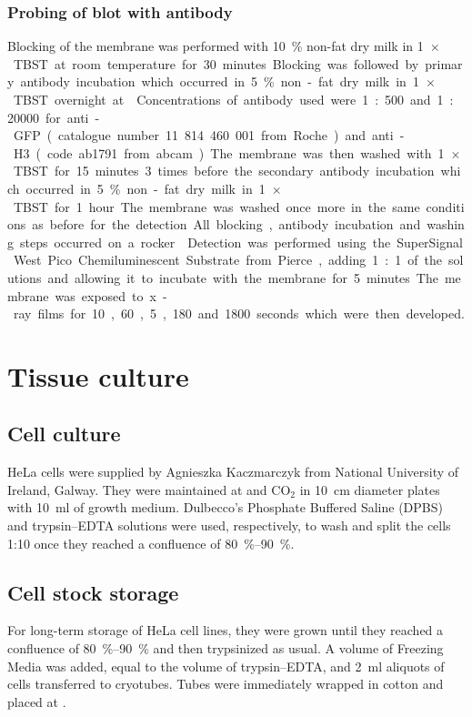     \subsubsection{Probing of blot with antibody}
      Blocking of the membrane was performed with \SI{10}{\percent} non-fat dry milk in \SI{1}{$\times$} TBST
      at room temperature for 30 minutes. Blocking was followed by primary antibody
      incubation which occurred in \SI{5}{\percent} non-fat dry milk in \SI{1}{$\times$} TBST overnight at
      . Concentrations of antibody used were 1:500 and 1:20000 for anti-GFP
      (catalogue number 11 814 460 001 from Roche) and anti-H3 (code ab1791 from
      abcam). The membrane was then washed with \SI{1}{$\times$} TBST for 15 minutes 3 times
      before the secondary antibody incubation which occurred in \SI{5}{\percent} non-fat dry
      milk in \SI{1}{$\times$} TBST for 1 hour. The membrane was washed once more in the same
      conditions as before for the detection. All blocking, antibody incubation and
      washing steps occurred on a rocker.
      
      Detection was performed using the SuperSignal West Pico Chemiluminescent
      Substrate from Pierce, adding 1:1 of the solutions and allowing it to incubate
      with the membrane for 5 minutes. The membrane was exposed to x-ray films for
      10, 60, 5, 180 and 1800 seconds which were then developed.


\section{Tissue culture}
  \subsection{Cell culture}
    HeLa cells were supplied by Agnieszka Kaczmarczyk from National University
    of Ireland, Galway. They were maintained at  and  CO$_2$ in \SI{10}{\cm}
    diameter plates with \SI{10}{\ml} of growth medium. Dulbecco's Phosphate Buffered
    Saline (DPBS) and trypsin--EDTA solutions were used, respectively, to wash
    and split the cells 1:10 once they reached a confluence of \SIrange{80}{90}{\percent}.

  \subsection{Cell stock storage}
    For long-term storage of HeLa cell lines, they were grown until they reached
    a confluence of \SIrange{80}{90}{\percent} and then trypsinized as usual. A volume of Freezing
    Media was added, equal to the volume of trypsin--EDTA, and \SI{2}{\ml} aliquots of
    cells transferred to cryotubes. Tubes were immediately wrapped in cotton and
    placed at .

